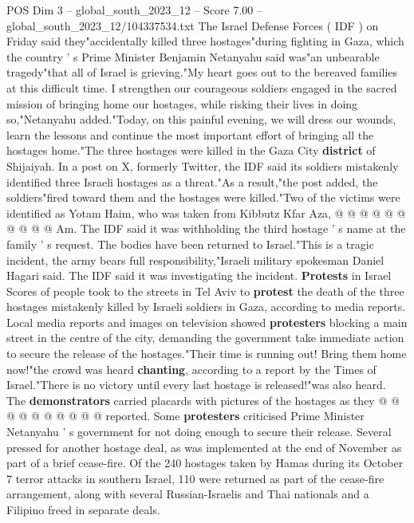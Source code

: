 \begin{textsample}{POS Dim 3 – global\_south\_2023\_12 – Score 7.00 – global\_south\_2023\_12/104337534.txt}  \label{ex:f3_pos_422}
The Israel Defense Forces ( IDF ) on Friday said they"accidentally killed three hostages"during fighting in Gaza, which the country ' s Prime Minister Benjamin Netanyahu said was"an unbearable tragedy"that all of Israel is grieving."My heart goes out to the bereaved families at this difficult time.
I strengthen our courageous soldiers engaged in the sacred mission of bringing home our hostages, while risking their lives in doing so,"Netanyahu added."Today, on this painful evening, we will dress our wounds, learn the lessons and continue the most important effort of bringing all the hostages home."The three hostages were killed in the Gaza City \textbf{district} of Shijaiyah.
In a post on X, formerly Twitter, the IDF said its soldiers mistakenly identified three Israeli hostages as a threat."As a result,"the post added, the soldiers"fired toward them and the hostages were killed."Two of the victims were identified as Yotam Haim, who was taken from Kibbutz Kfar Aza, @ @ @ @ @ @ @ @ @ @ Am.
The IDF said it was withholding the third hostage ' s name at the family ' s request.
The bodies have been returned to Israel."This is a tragic incident, the army bears full responsibility,"Israeli military spokesman Daniel Hagari said.
The IDF said it was investigating the incident. \textbf{Protests} in Israel Scores of people took to the streets in Tel Aviv to \textbf{protest} the death of the three hostages mistakenly killed by Israeli soldiers in Gaza, according to media reports.
Local media reports and images on television showed \textbf{protesters} blocking a main street in the centre of the city, demanding the government take immediate action to secure the release of the hostages."Their time is running out!
Bring them home now!"the crowd was heard \textbf{chanting}, according to a report by the Times of Israel."There is no victory until every last hostage is released!"was also heard.
The \textbf{demonstrators} carried placards with pictures of the hostages as they @ @ @ @ @ @ @ @ @ @ reported.
Some \textbf{protesters} criticised Prime Minister Netanyahu ' s government for not doing enough to secure their release.
Several pressed for another hostage deal, as was implemented at the end of November as part of a brief cease-fire.
Of the 240 hostages taken by Hamas during its October 7 terror attacks in southern Israel, 110 were returned as part of the cease-fire arrangement, along with several Russian-Israelis and Thai nationals and a Filipino freed in separate deals.

\end{textsample}
